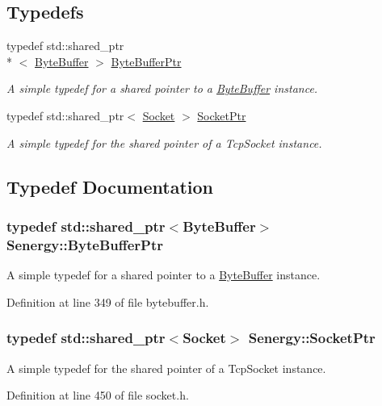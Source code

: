 \subsection*{Typedefs}
\begin{DoxyCompactItemize}
\item 
typedef std\-::shared\-\_\-ptr\\*
$<$ \hyperlink{class_senergy_1_1_byte_buffer}{Byte\-Buffer} $>$ \hyperlink{namespace_senergy_a30f5cfaeb333ffdf2c3332cc590a57ea}{Byte\-Buffer\-Ptr}
\begin{DoxyCompactList}\small\item\em A simple typedef for a shared pointer to a \hyperlink{class_senergy_1_1_byte_buffer}{Byte\-Buffer} instance. \end{DoxyCompactList}\item 
typedef std\-::shared\-\_\-ptr$<$ \hyperlink{class_senergy_1_1_socket}{Socket} $>$ \hyperlink{namespace_senergy_a9014e48a368555ba932efd8d17eb2d23}{Socket\-Ptr}
\begin{DoxyCompactList}\small\item\em A simple typedef for the shared pointer of a Tcp\-Socket instance. \end{DoxyCompactList}\end{DoxyCompactItemize}


\subsection{Typedef Documentation}
\hypertarget{namespace_senergy_a30f5cfaeb333ffdf2c3332cc590a57ea}{
\subsubsection[{Byte\-Buffer\-Ptr}]{\setlength{\rightskip}{0pt plus 5cm}typedef std\-::shared\-\_\-ptr$<${\bf Byte\-Buffer}$>$ {\bf Senergy\-::\-Byte\-Buffer\-Ptr}}}\label{namespace_senergy_a30f5cfaeb333ffdf2c3332cc590a57ea}


A simple typedef for a shared pointer to a \hyperlink{class_senergy_1_1_byte_buffer}{Byte\-Buffer} instance. 



Definition at line 349 of file bytebuffer.\-h.

\hypertarget{namespace_senergy_a9014e48a368555ba932efd8d17eb2d23}{
\subsubsection[{Socket\-Ptr}]{\setlength{\rightskip}{0pt plus 5cm}typedef std\-::shared\-\_\-ptr$<${\bf Socket}$>$ {\bf Senergy\-::\-Socket\-Ptr}}}\label{namespace_senergy_a9014e48a368555ba932efd8d17eb2d23}


A simple typedef for the shared pointer of a Tcp\-Socket instance. 



Definition at line 450 of file socket.\-h.

